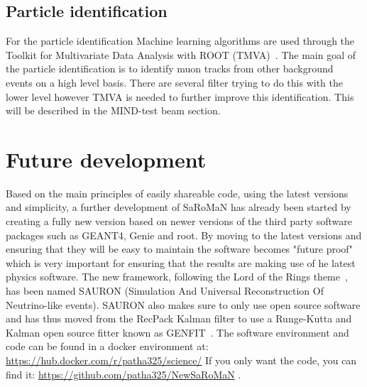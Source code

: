 

\subsection{Particle identification}
For the particle identification Machine learning algorithms are used through the Toolkit for Multivariate Data Analysis with ROOT (TMVA)~\cite{TMVA}. The main goal of the particle identification is to identify muon tracks from other background events on a high level basis. There are several filter trying to do this with the lower level however TMVA is needed to further improve this identification. This will be described in the MIND-test beam section.



\pagebreak
\section{Future development}
Based on the main principles of easily shareable code, using the latest versions and simplicity, a further development of SaRoMaN has already been started by creating a fully new version based on newer versions of the third party software packages such as GEANT4, Genie and root. By moving to the latest versions and ensuring that they will be easy to maintain the software becomes "future proof" which is very important for ensuring that the results are making use of he latest physics software. The new framework, following the Lord of the Rings theme~\cite{79tolkien2012lord}, has been named SAURON (Simulation And Universal Reconstruction Of Neutrino-like events).  SAURON also makes sure to only use open source software and has thus moved from the RecPack Kalman filter to use a Runge-Kutta and Kalman open source fitter known as GENFIT~\cite{81Genfit}.
The software environment and code can be found in  a docker environment at: \url{https://hub.docker.com/r/patha325/science/} If you only want the code, you can find it: \url{https://github.com/patha325/NewSaRoMaN} .

